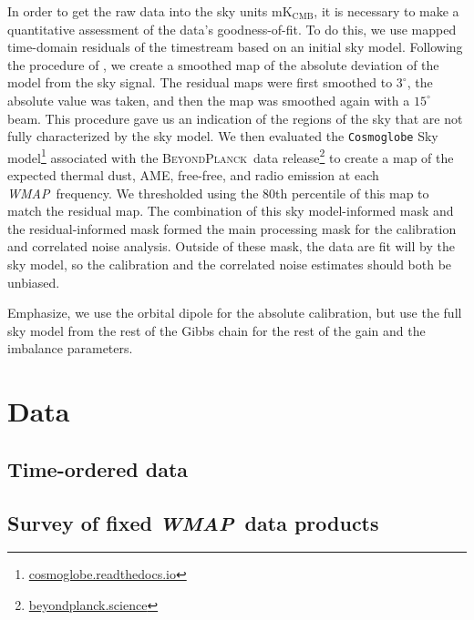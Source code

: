 \documentclass[twocolumn]{../../common/aa}
\def\WMAP{\emph{WMAP}}
\newcommand{\BP}{\textsc{BeyondPlanck}}
\begin{document}


In order to get the raw data into the sky units $\mathrm{mK_{CMB}}$, it is necessary to make a quantitative assessment of the data's goodness-of-fit. To do this, we use mapped time-domain residuals of the timestream based on an initial sky model. Following the procedure of \citet{bp06}, we create a smoothed map of the absolute deviation of the model from the sky signal. The residual maps were first smoothed to $3^\circ$, the absolute value was taken, and then the map was smoothed again with a $15^\circ$ beam. This procedure gave us an indication of the regions of the sky that are not fully characterized by the sky model. We then evaluated the \texttt{Cosmoglobe} Sky model\footnote{\url{cosmoglobe.readthedocs.io}} associated with the \BP\ data release\footnote{\url{beyondplanck.science}} to create a map of the expected thermal dust, AME, free-free, and radio emission at each \WMAP\ frequency. We thresholded using the 80th percentile of this map to match the residual map. The combination of this sky model-informed mask and the residual-informed mask formed the main processing mask for the calibration and correlated noise analysis.
Outside of these mask, the data are fit will by the sky model, so the calibration and the correlated noise estimates should both be unbiased.

Emphasize, we use the orbital dipole for the absolute calibration, but use the full sky model from the rest of the Gibbs chain for the rest of the gain and the imbalance parameters.


\section{Data}
\label{sec:data}

\subsection{Time-ordered data}
\label{sec:tod}

\subsection{Survey of fixed \WMAP\ data products}
\label{sec:fixedproducts}
\end{document}
